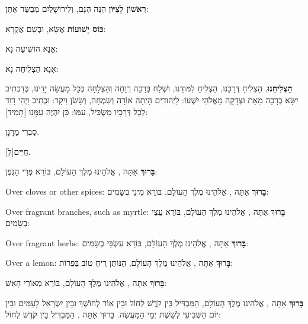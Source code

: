 
\label{havdalah}

\textbf{רִאשׁוֹן לְצִיּוֹן} הִנֵּה הִנָּם, וְלִירוּשָׁלַיִם מְבַשֵּׂר אֶתֵּן:

\textbf{כּוֹס יְשׁוּעוֹת} אֶשָּׂא, וּבְשֵׁם \Shem{} אֶקְרָא:

אָנָּא \Shem{} הוֹשִׁיעָה נָּא:

אָנָּא \Shem{} הַצְלִיחָה נָא:

\textbf{הַצְלִיחֵנוּ}, הַצְלִיחַ דְּרָכֵנוּ, הַצְלִיחַ לִמּוּדֵנוּ, וּשְׁלַח בְּרָכָה רְוָחָה וְהַצְלָחָה בְּכָל מַעֲשֵׂה יָדֵינוּ, כְּדִכְתִיב יִשָּׂא בְרָכָה מֵאֵת \Shem{} וּצְדָקָה מֵאֱלֹהֵי יִשְׁעוֹ: לַיְּהוּדִים הָיְתָה אוֹרָה וְשִׂמְחָה, וְשָׂשֹׂן וִיקָר: וּכְתִיב וַיְהִי דָוִד לְכָל דְּרָכָיו מַשְׂכִּיל,  עִמּוֹ: כֵּן יִהְיֶה עִמָּנוּ [תָּמִיד]:

סַבְרִי מָרָנָן.

[לְ]חַיִּים.

\textbf{בָּרוּךְ} אַתָּה \Shem{}, אֱלֹהֵינוּ מֶלֶךְ הָעוֹלָם, בּוֹרֵא פְּרִי הַגֶּפֶן:


\begin{seasonal}{Over cloves or other spices:}
\textbf{בָּרוּךְ} אַתָּה \Shem{}, אֱלֹהֵינוּ מֶלֶךְ הָעוֹלָם, בּוֹרֵא מִינֵי בְשָׂמִים:
\end{seasonal}

\begin{seasonal}{Over fragrant branches, such as myrtle:}
\textbf{בָּרוּךְ} אַתָּה \Shem{}, אֱלֹהֵינוּ מֶלֶךְ הָעוֹלָם, בּוֹרֵא עֲצֵי בְשָׂמִים:
\end{seasonal}

\begin{seasonal}{Over fragrant herbs:}
\textbf{בָּרוּךְ} אַתָּה \Shem{}, אֱלֹהֵינוּ מֶלֶךְ הָעוֹלָם, בּוֹרֵא עִשְׂבֵּי בְשָׂמִים:
\end{seasonal}

\begin{seasonal}{Over a lemon:}
\textbf{בָּרוּךְ} אַתָּה \Shem{}, אֱלֹהֵינוּ מֶלֶךְ הָעוֹלָם, הַנּוֹתֵן רֵיחַ טוֹב בַּפֵּרוֹת:
\end{seasonal}

\textbf{בָּרוּךְ} אַתָּה \Shem{}, אֱלֹהֵינוּ מֶלֶךְ הָעוֹלָם, בּוֹרֵא מְאוֹרֵי הָאֵשׁ:

\textbf{בָּרוּךְ} אַתָּה \Shem{}, אֱלֹהֵינוּ מֶלֶךְ הָעוֹלָם, הַמַּבְדִּיל בֵּין קֹדֶשׁ לְחוֹל וּבֵין אוֹר לְחוֹשֶׁךְ וּבֵין יִשְׂרָאֵל לָעַמִּים וּבֵין יוֹם הַשְּׁבִיעִי לְשֵׁשֶׁת יְמֵי הַמַּעֲשֶׂה. בָּרוּךְ אַתָּה \Shem{}, הַמַּבְדִּיל בֵּין קֹדֶשׁ לְחוֹל:

